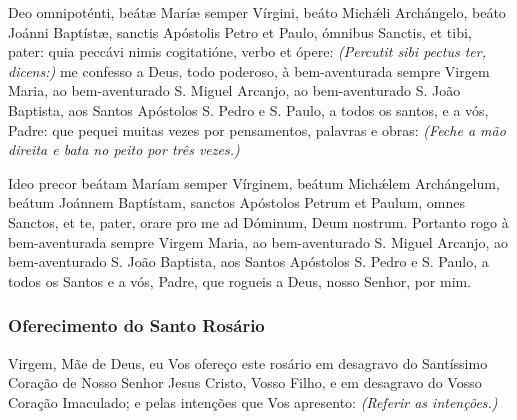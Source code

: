 \begin{paracol}{2}
 Deo omnipoténti, beátæ Maríæ semper Vírgini, beáto Michǽli Archángelo, beáto Joánni Baptístæ, sanctis Apóstolis Petro et Paulo, ómnibus Sanctis, et tibi, pater: quia peccávi nimis cogitatióne, verbo et ópere: \emph{(Percutit sibi pectus ter, dicens:)}
\switchcolumn
{} me confesso a Deus, todo poderoso, à bem-aventurada sempre Virgem Maria, ao bem-aventurado S. Miguel Arcanjo, ao bem-aventurado S. João Baptista, aos Santos Apóstolos S. Pedro e S. Paulo, a todos os santos, e a vós, Padre: que pequei muitas vezes por pensamentos, palavras e obras: \emph{(Feche a mão direita e bata no peito por três vezes.)}
\switchcolumn*
\begin{nscenter}\emph{}\end{nscenter}
\switchcolumn
\begin{nscenter}\emph{}\end{nscenter}
\switchcolumn*
Ideo precor beátam Maríam semper Vírginem, beátum Michǽlem Archángelum, beátum Joánnem Baptístam, sanctos Apóstolos Petrum et Paulum, omnes Sanctos, et te, pater, orare pro me ad Dóminum, Deum nostrum.
\switchcolumn
Portanto rogo à bem-aventurada sempre Virgem Maria, ao bem-aventurado S. Miguel Arcanjo, ao bem-aventurado S. João Baptista, aos Santos Apóstolos S. Pedro e S. Paulo, a todos os Santos e a vós, Padre, que rogueis a Deus, nosso Senhor, por mim.
\end{paracol}

\subsubsection{Oferecimento do Santo Rosário}

 Virgem, Mãe de Deus, eu Vos ofereço este rosário em desagravo do Santíssimo Coração de Nosso Senhor Jesus Cristo, Vosso Filho, e em desagravo do Vosso Coração Imaculado; e pelas intenções que Vos apresento: \emph{(Referir as intenções.)}

\emph{}

